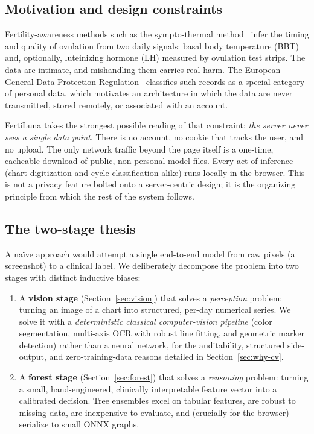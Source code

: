 \documentclass[11pt,a4paper]{article}
\begin{document}
\subsection{Motivation and design constraints}
Fertility-awareness methods such as the sympto-thermal
method~\cite{rohrer2015fertility} infer the timing and quality of ovulation from
two daily signals: basal body temperature (BBT) and, optionally, luteinizing
hormone (LH) measured by ovulation test strips. The data are intimate, and
mishandling them carries real harm. The European General Data Protection
Regulation~\cite{gdpr2016} classifies such records as a special category of
personal data, which motivates an architecture in which the data are never
transmitted, stored remotely, or associated with an account.

FertiLuna takes the strongest possible reading of that constraint:
\emph{the server never sees a single data point}. There is no account, no
cookie that tracks the user, and no upload. The only network traffic beyond
the page itself is a one-time, cacheable download of public, non-personal
model files. Every act of inference (chart digitization and cycle
classification alike) runs locally in the browser. This is not a privacy
feature bolted onto a server-centric design; it is the organizing principle
from which the rest of the system follows.

\subsection{The two-stage thesis}
A naïve approach would attempt a single end-to-end model from raw pixels (a
screenshot) to a clinical label. We deliberately decompose the problem into
two stages with distinct inductive biases:

\begin{enumerate}
  \item A \textbf{vision stage} (Section~\ref{sec:vision}) that solves a
  \emph{perception} problem: turning an image of a chart into structured,
  per-day numerical series. We solve it with a \emph{deterministic classical
  computer-vision pipeline} (color segmentation, multi-axis OCR with robust
  line fitting, and geometric marker detection) rather than a neural network,
  for the auditability, structured side-output, and zero-training-data reasons
  detailed in Section~\ref{sec:why-cv}.
  \item A \textbf{forest stage} (Section~\ref{sec:forest}) that solves a
  \emph{reasoning} problem: turning a small, hand-engineered, clinically
  interpretable feature vector into a calibrated decision. Tree ensembles
  excel on tabular features, are robust to missing data, are inexpensive to
  evaluate, and (crucially for the browser) serialize to small ONNX graphs.
\end{enumerate}
\end{document}
